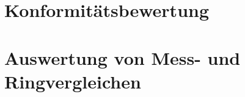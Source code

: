 \documentclass[a4paper,11pt]{book}
\begin{document}
%
\chapter{Konformitätsbewertung}

%
\chapter{Auswertung von Mess- und Ringvergleichen}

%
\end{document}
